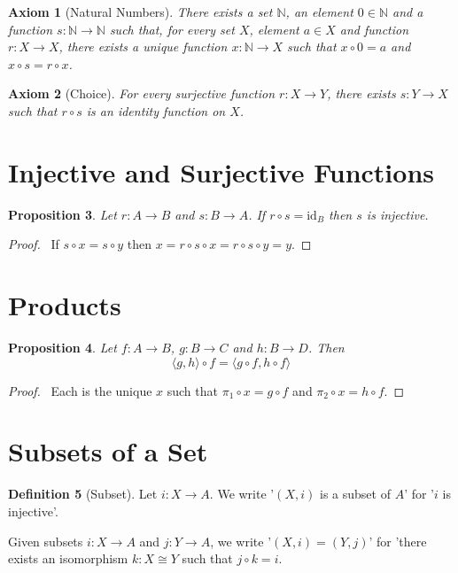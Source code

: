 \documentclass{book}
\let\qed\relax
\newtheorem{ax}{Axiom}[chapter]
\newtheorem{prop}[ax]{Proposition}
\theoremstyle{definition}
\newtheorem{df}[ax]{Definition}
\newcommand{\id}[1]{\ensuremath{\mathrm{id}_{#1}}}
\begin{document}
\begin{ax}[Natural Numbers]
There exists a set $\mathbb{N}$, an element $0 \in \mathbb{N}$ and a function $s : \mathbb{N} \rightarrow \mathbb{N}$ such that, for every set $X$, element $a \in X$ and function $r : X \rightarrow X$, there exists a unique function $x : \mathbb{N} \rightarrow X$ such that $x \circ 0 = a$ and $x \circ s = r \circ x$.
\end{ax}

\begin{ax}[Choice]
For every surjective function $r : X \rightarrow Y$, there exists $s : Y \rightarrow X$ such that $r \circ s$ is an identity function on $X$.
\end{ax}

\section{Injective and Surjective Functions}

\begin{prop}
Let $r : A \rightarrow B$ and $s : B \rightarrow A$. If $r \circ s = \id{B}$ then $s$ is injective.
\end{prop}

\begin{proof}
\pf\ If $s \circ x = s \circ y$ then $x = r \circ s \circ x = r \circ s \circ y = y$. \qed
\end{proof}

\section{Products}

\begin{prop}
Let $f : A \rightarrow B$, $g : B \rightarrow C$ and $h : B \rightarrow D$. Then
\[ \langle g, h \rangle \circ f = \langle g \circ f, h \circ f \rangle \]
\end{prop}

\begin{proof}
\pf\ Each is the unique $x$ such that $\pi_1 \circ x = g \circ f$ and $\pi_2 \circ x = h \circ f$. \qed
\end{proof}

\section{Subsets of a Set}

\begin{df}[Subset]
Let $i : X \rightarrow A$. We write '$(X,i)$ is a subset of $A$' for '$i$ is injective'.

Given subsets $i : X \rightarrow A$ and $j : Y \rightarrow A$,
we write '$(X,i) = (Y,j)$' for 'there exists an isomorphism $k : X \cong Y$ such that $j \circ k = i$.
\end{df}
\end{document}
